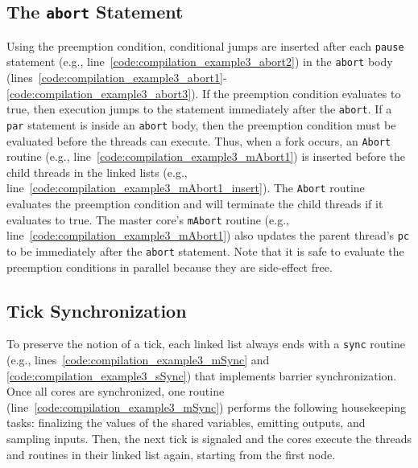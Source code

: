\subsection{The \texttt{abort} Statement}
Using the preemption condition, conditional jumps are
inserted after each \verb$pause$ statement (e.g., 
line~\ref{code:compilation_example3_abort2}) in the 
\verb$abort$ body 
(lines~\ref{code:compilation_example3_abort1}-\ref{code:compilation_example3_abort3}). 
If the preemption condition evaluates to true, then 
execution jumps to the statement immediately after the
\verb$abort$. If a \verb$par$ statement is inside
an \verb$abort$ body, then the preemption condition must be
evaluated before the threads can execute. Thus, when a fork
occurs, an \verb$Abort$ routine (e.g., line~\ref{code:compilation_example3_mAbort1}) 
is inserted before the child threads in the linked lists 
(e.g., line~\ref{code:compilation_example3_mAbort1_insert}). The \verb$Abort$
routine evaluates the preemption condition and will
terminate the child threads if it evaluates to true. The
master core's \verb$mAbort$ routine 
(e.g., line~\ref{code:compilation_example3_mAbort1})
also updates the parent thread's \verb$pc$ to be immediately after
the \verb$abort$ statement. Note that it is safe to evaluate the 
preemption conditions in parallel because they are side-effect 
free.


\subsection{Tick Synchronization}
\label{sec:compilation_sync} 
To preserve the notion of a tick, each linked list always
ends with a \verb$sync$ routine (e.g., lines~\ref{code:compilation_example3_mSync}
and \ref{code:compilation_example3_sSync}) that implements barrier
synchronization. Once all cores are 
synchronized, one routine (line~\ref{code:compilation_example3_mSync})
performs the following housekeeping tasks: finalizing the
values of the shared variables, emitting outputs, and sampling
inputs. Then, the next tick is signaled and the cores
execute the threads and routines in their linked list again,
starting from the first node.


%
%
